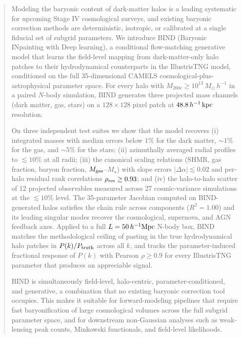 \documentclass[linenumbers,trackchanges, twocolumn]{aastex701}
\begin{document}
\begin{abstract}
Modeling the baryonic content of dark-matter halos is a leading systematic for upcoming Stage IV cosmological surveys, and existing baryonic correction methods are deterministic, isotropic, or calibrated at a single fiducial set of subgrid parameters. We introduce \textsc{BIND} (Baryonic INpainting with Deep learning), a conditional flow-matching generative model that learns the field-level mapping from dark-matter-only halo patches to their hydrodynamical counterparts in the IllustrisTNG model, conditioned on the full 35-dimensional CAMELS cosmological-plus-astrophysical parameter space. For every halo with $M_{200c}\geq 10^{13}\,M_\odot\,h^{-1}$ in a paired $N$-body simulation, \textsc{BIND} generates three projected mass channels (dark matter, gas, stars) on a $128\times 128$ pixel patch at $48.8\,h^{-1}\,{\rm kpc}$ resolution.

On three independent test suites we show that the model recovers (i) integrated masses with median errors below $1\%$ for the dark matter, $\sim\!1\%$ for the gas, and $\sim\!5\%$ for the stars; (ii) azimuthally averaged radial profiles to $\lesssim 10\%$ at all radii; (iii) the canonical scaling relations (SHMR, gas fraction, baryon fraction, $M_{\rm gas}$--$M_\star$) with slope errors $|\Delta\alpha|\lesssim 0.02$ and per-halo residual rank correlations $\rho_{\rm res}\geq 0.93$; and (iv) the halo-to-halo scatter of 12 projected observables measured across 27 cosmic-variance simulations at the $\lesssim\!10\%$ level. The 35-parameter Jacobian computed on \textsc{BIND}-generated halos satisfies the chain rule across components ($R^2=1.00$) and its leading singular modes recover the cosmological, supernova, and AGN feedback axes. Applied to a full $L=50\,h^{-1}{\rm Mpc}$ N-body box, \textsc{BIND} matches the methodological ceiling of pasting in the true hydrodynamical halo patches in $P(k)/P_{\rm truth}$ across all $k$, and tracks the parameter-induced fractional response of $P(k)$ with Pearson $\rho\geq 0.9$ for every IllustrisTNG parameter that produces an appreciable signal.

\textsc{BIND} is simultaneously field-level, halo-centric, parameter-conditioned, and generative, a combination that no existing baryonic correction tool occupies. This makes it suitable for forward-modeling pipelines that require fast baryonification of large cosmological volumes across the full subgrid parameter space, and for downstream non-Gaussian analyses such as weak-lensing peak counts, Minkowski functionals, and field-level likelihoods.
\end{abstract}
\end{document}
